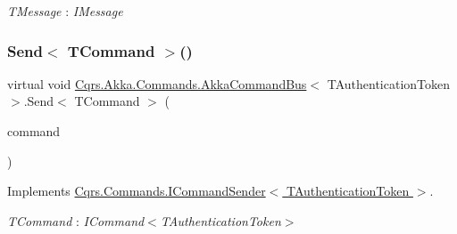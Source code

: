 \begin{Desc}
\item[Type Constraints]\begin{description}
\item[{\em T\+Message} : {\em I\+Message}]\end{description}
\end{Desc}
\mbox{\label{classCqrs_1_1Akka_1_1Commands_1_1AkkaCommandBus_a696f471533265685f80922e39727288e_a696f471533265685f80922e39727288e}} 
\subsubsection{\texorpdfstring{Send$<$ T\+Command $>$()}{Send< TCommand >()}\hspace{0.1cm}{\footnotesize\ttfamily [1/2]}}
{\footnotesize\ttfamily virtual void \hyperlink{classCqrs_1_1Akka_1_1Commands_1_1AkkaCommandBus}{Cqrs.\+Akka.\+Commands.\+Akka\+Command\+Bus}$<$ T\+Authentication\+Token $>$.Send$<$ T\+Command $>$ (\begin{DoxyParamCaption}\item[{T\+Command}]{command }\end{DoxyParamCaption})\hspace{0.3cm}{\ttfamily [virtual]}}



Implements \hyperlink{interfaceCqrs_1_1Commands_1_1ICommandSender_a551d69f8679399fc0ce0fd99dead507a_a551d69f8679399fc0ce0fd99dead507a}{Cqrs.\+Commands.\+I\+Command\+Sender$<$ T\+Authentication\+Token $>$}.

\begin{Desc}
\item[Type Constraints]\begin{description}
\item[{\em T\+Command} : {\em I\+Command$<$T\+Authentication\+Token$>$}]\end{description}
\end{Desc}
\mbox{\label{classCqrs_1_1Akka_1_1Commands_1_1AkkaCommandBus_a06b7b148493c67d79aaf6b7d59afa487_a06b7b148493c67d79aaf6b7d59afa487}} 
